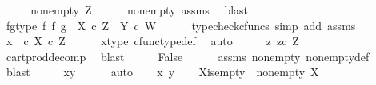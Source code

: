 \begin{isabellebody}
\ \ \isamarkupfalse%
\ \isamarkupfalse%
\ {\isachardoublequoteopen}{\isasymnot}{\isacharparenleft}{\kern0pt}nonempty\ Z{\isacharparenright}{\kern0pt}{\isachardoublequoteclose}\isanewline
\ \ \ \ \isamarkupfalse%
\ nonempty\ assms{\isacharparenleft}{\kern0pt}{}{\isacharparenright}{\kern0pt}\ \isamarkupfalse%
\ blast\isanewline
\ \ \isamarkupfalse%
\ fg{\isacharunderscore}{\kern0pt}type{\isacharcolon}{\kern0pt}\ {\isachardoublequoteopen}f\ {\isasymtimes}\isactrlsub f\ g\ {\isacharcolon}{\kern0pt}\ X\ {\isasymtimes}\isactrlsub c\ Z\ {\isasymrightarrow}\ Y\ {\isasymtimes}\isactrlsub c\ W{\isachardoublequoteclose}\isanewline
\ \ \ \ \isamarkupfalse%
\ {\isacharparenleft}{\kern0pt}typecheck{\isacharunderscore}{\kern0pt}cfuncs{\isacharcomma}{\kern0pt}\ simp\ add{\isacharcolon}{\kern0pt}\ assms{\isacharparenleft}{\kern0pt}{}{\isacharcomma}{\kern0pt}{}{\isacharparenright}{\kern0pt}{\isacharparenright}{\kern0pt}\isanewline
\ \ \isamarkupfalse%
\ \isamarkupfalse%
\ {\isachardoublequoteopen}x\ \ {\isasymin}\isactrlsub c\ X\ {\isasymtimes}\isactrlsub c\ Z{\isachardoublequoteclose}\isanewline
\ \ \ \ \isamarkupfalse%
\ x{\isacharunderscore}{\kern0pt}type\ cfunc{\isacharunderscore}{\kern0pt}type{\isacharunderscore}{\kern0pt}def\ \isamarkupfalse%
\ auto\isanewline
\ \ \isamarkupfalse%
\ \isamarkupfalse%
\ {\isachardoublequoteopen}{\isasymexists}z{\isachardot}{\kern0pt}\ z{\isasymin}\isactrlsub c\ Z{\isachardoublequoteclose}\isanewline
\ \ \ \ \isamarkupfalse%
\ cart{\isacharunderscore}{\kern0pt}prod{\isacharunderscore}{\kern0pt}decomp\ \isamarkupfalse%
\ blast\isanewline
\ \ \isamarkupfalse%
\ \isamarkupfalse%
\ False\isanewline
\ \ \ \ \isamarkupfalse%
\ assms{\isacharparenleft}{\kern0pt}{}{\isacharparenright}{\kern0pt}\ nonempty\ nonempty{\isacharunderscore}{\kern0pt}def\ \isamarkupfalse%
\ blast\isanewline
\ \ \isamarkupfalse%
\ \isamarkupfalse%
\ {\isachardoublequoteopen}x{\isacharequal}{\kern0pt}y{\isachardoublequoteclose}\isanewline
\ \ \ \ \isamarkupfalse%
\ auto\isanewline
{}\isamarkupfalse%
\isanewline
\ \ \isamarkupfalse%
\ x\ y\isanewline
\ \ \isamarkupfalse%
\ X{\isacharunderscore}{\kern0pt}is{\isacharunderscore}{\kern0pt}empty{\isacharcolon}{\kern0pt}\ {\isachardoublequoteopen}{\isasymnot}\ nonempty\ X{\isachardoublequoteclose}\isanewline

\end{isabellebody}
